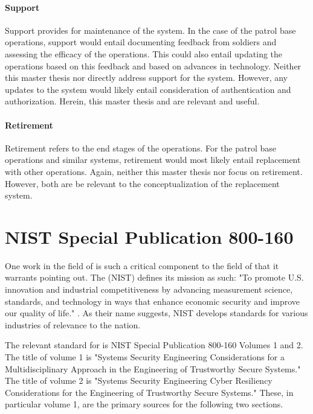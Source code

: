 \documentclass[../../main/main.tex]{subfiles}
\begin{document}
\paragraph*{Support}
Support provides for maintenance of the system.  In the case of the patrol base operations, support would entail documenting feedback from soldiers and assessing the efficacy of the operations.  This could also entail updating the operations based on this feedback and based on advances in technology.  Neither this master thesis nor  directly address support for the system.  However, any updates to the system would likely entail consideration of authentication and authorization. Herein, this master thesis and  are relevant and useful.

\paragraph*{Retirement}
Retirement refers to the end stages of the operations.  For the patrol base operations and similar systems, retirement would most likely entail replacement with other operations.  Again, neither this master thesis nor  focus on retirement.  However, both are be relevant to the conceptualization of the replacement system.

\section{NIST Special Publication 800-160}
One work in the field of  is such a critical component to the field of  that it warrants pointing out. The  (NIST) defines its mission as such: "To promote U.S. innovation and industrial competitiveness by advancing measurement science, standards, and technology in ways that enhance economic security and improve our quality of life." \cite{nistmission}.  As their name suggests, NIST develops standards for various industries of relevance to the nation.   

The relevant standard for  is NIST Special Publication 800-160 Volumes 1 and 2. The title of volume 1 is "Systems Security Engineering
Considerations for a Multidisciplinary Approach in the Engineering of Trustworthy Secure Systems."  The title of volume 2 is "Systems Security Engineering Cyber Resiliency Considerations for the Engineering of Trustworthy Secure Systems."   These, in particular volume 1, are the primary sources for the following two sections.  
\end{document}
